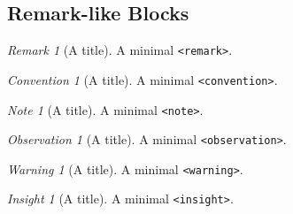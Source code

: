 \documentclass{amsart}
\theoremstyle{plain}%
\theoremstyle{definition}%
\theoremstyle{remark}%
\newtheorem{remark}[theorem]{Remark}
\newtheorem{warning}[theorem]{Warning}
\newtheorem{convention}[theorem]{Convention}
\newtheorem{insight}[theorem]{Insight}
\newtheorem{note}[theorem]{Note}
\newtheorem{observation}[theorem]{Observation}
\newcommand{\mono}[1]{\texttt{#1}}
\numberwithin{equation}{section}
\begin{document}
\subsection{Remark-like Blocks}\label{block-samples-remark-like}%
\begin{remark}[A title]\label{block-samples-remark-like-2}%
%
A minimal \mono{<remark>}.%
\end{remark}
\begin{convention}[A title]\label{block-samples-remark-like-3}%
%
A minimal \mono{<convention>}.%
\end{convention}
\begin{note}[A title]\label{block-samples-remark-like-4}%
%
A minimal \mono{<note>}.%
\end{note}
\begin{observation}[A title]\label{block-samples-remark-like-5}%
%
A minimal \mono{<observation>}.%
\end{observation}
\begin{warning}[A title]\label{block-samples-remark-like-6}%
%
A minimal \mono{<warning>}.%
\end{warning}
\begin{insight}[A title]\label{block-samples-remark-like-7}%
%
A minimal \mono{<insight>}.%
\end{insight}
%
%
\typeout{************************************************}
\typeout{************************************************}
%
\end{document}
